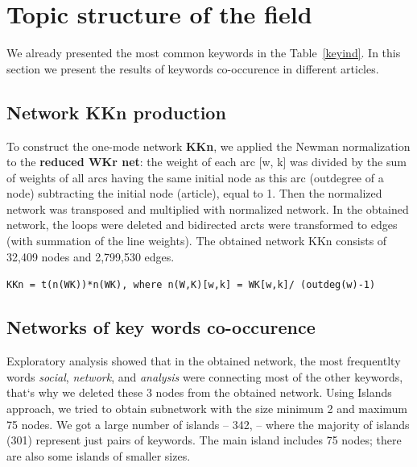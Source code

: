 \documentclass[11pt]{article} %
\begin{document}
\section{Topic structure of the field}  

We already presented the most common keywords in the  Table~\ref{keyind}. In this section we present the results of keywords co-occurence in different articles.  \medskip

\subsection{Network KKn production}

To construct the one-mode network \textbf{KKn}, we applied the Newman normalization  to the \textbf{reduced WKr net}: the weight of each arc [w, k] was divided by the sum of weights of all arcs having the same initial node as this arc (outdegree of a node) subtracting the initial node (article), equal to 1. Then the normalized network was transposed and multiplied with normalized network. In the obtained network, the loops were deleted and bidirected arcts were transformed to edges (with summation of the line weights). The obtained network KKn consists of 32,409 nodes and 2,799,530 edges. \medskip

\texttt{KKn = t(n(WK))*n(WK), where n(W,K)[w,k] = WK[w,k]/ (outdeg(w)-1)} \medskip

\subsection{Networks of key words co-occurence}

Exploratory analysis showed that in the obtained network, the most frequentlty words \textit{social}, \textit{network}, and \textit{analysis} were connecting most of the other keywords, that`s why we deleted these 3 nodes from the obtained network. Using Islands approach, we tried to obtain subnetwork with the size minimum 2 and maximum 75 nodes. We got a large number of islands -- 342, -- where the majority of islands (301) represent just pairs of keywords. The main island includes 75 nodes; there are also some islands of smaller sizes. \medskip
\end{document}
